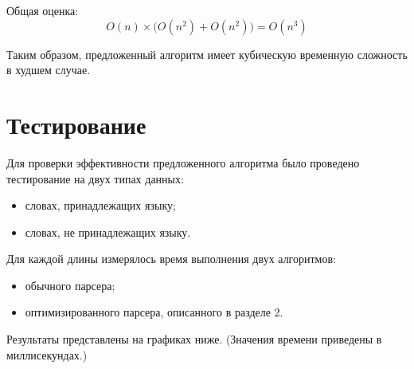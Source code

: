 \documentclass{article}
\begin{document}
Общая оценка: 
\[
O(n) \times \big( O(n^2) + O(n^2) \big) = O(n^3)
\]

Таким образом, предложенный алгоритм имеет кубическую временную сложность в худшем случае.

\section{Тестирование}

Для проверки эффективности предложенного алгоритма было проведено тестирование на двух типах данных:
\begin{itemize}
    \item словах, принадлежащих языку;
    \item словах, не принадлежащих языку.
\end{itemize}

Для каждой длины измерялось время выполнения двух алгоритмов:
\begin{itemize}
    \item обычного парсера;
    \item оптимизированного парсера, описанного в разделе 2.
\end{itemize}

Результаты представлены на графиках ниже. (Значения времени приведены в миллисекундах.)
\end{document}
